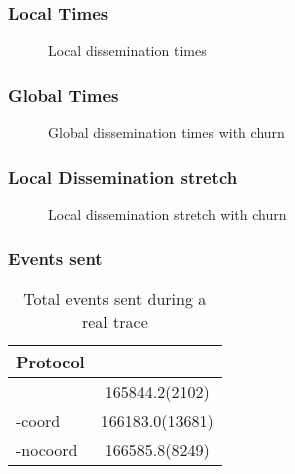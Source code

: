 \subsubsection{Local Times}
\begin{figure}[hpt]
	\centering
	
	\vspace{-2mm} 
	\caption{Local dissemination times}
	\vspace{-2mm}
	\label{fig:local-times-real-churn} 
\end{figure}

\subsubsection{Global Times}

\begin{figure}[hpt]
	\centering
	
	\vspace{-2mm} 
	\caption{Global dissemination times with churn}
	\vspace{-2mm} 
	\label{fig:global-times-real-churn} 
\end{figure}
\subsubsection{Local Dissemination stretch}

\begin{figure}[hpt]
	\centering
	
	\vspace{-2mm} 
	\caption{Local dissemination stretch with churn}
	\vspace{-2mm}
	\label{fig:local-delta-real-churn}   
\end{figure}
\subsubsection{Events sent}
\begin{table}[hpt]
	\centering
	\caption{Total events sent during a real trace}
\begin{tabular}{lS}
	\toprule
	Protocol &\\
	\midrule
	\epto & 165844.2(2102)\\
	\jgroups-coord & 166183.0(13681)\\
	\jgroups-nocoord & 166585.8(8249)\\
	\bottomrule
\end{tabular}
    \label{table:total-sent-real-churn}
\end{table}
%	
